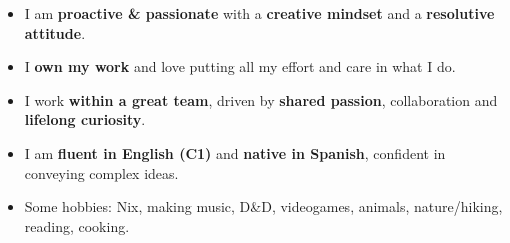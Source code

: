 \documentclass[10pt]{developercv} %
\begin{document}
\vspace{0.5cm}



\begin{minipage}[t]{1\textwidth} %
	\vspace{-\baselineskip} %
		\begin{itemize}
			\item I am \textbf{proactive \& passionate} with a \textbf{creative mindset} and a \textbf{resolutive attitude}.
			\item I \textbf{own my work} and love putting all my effort and care in what I do.
			\item I work \textbf{within a great team}, driven by \textbf{shared passion}, collaboration and \textbf{lifelong curiosity}.
			\item I am \textbf{fluent in English (C1)} and \textbf{native in Spanish}, confident in conveying complex ideas.
			\item Some hobbies: Nix, making music, D\&D, videogames, animals, nature/hiking, reading, cooking.
		\end{itemize}
\end{minipage}
\hfill %



\end{document}
